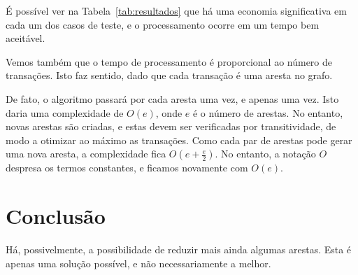 \documentclass[12pt]{article}
\begin{document}
É possível ver na Tabela~\ref{tab:resultados} que há uma economia significativa
em cada um dos casos de teste, e o processamento ocorre em um tempo bem aceitável.

Vemos também que o tempo de processamento é proporcional ao número de
transações. Isto faz sentido, dado que cada transação é uma aresta no grafo.

De fato, o algoritmo passará por cada aresta uma vez, e apenas uma vez. Isto
daria uma complexidade de $O(e)$, onde $e$ é o número de arestas. No entanto,
novas arestas são criadas, e estas devem ser verificadas por transitividade, de
modo a otimizar ao máximo as transações. Como cada par de arestas pode gerar uma
nova aresta, a complexidade fica $O(e + \frac{e}{2})$. No entanto, a notação $O$
despresa os termos constantes, e ficamos novamente com $O(e)$.

\section{Conclusão}\label{sec:conclusao}

Há, possivelmente, a possibilidade de reduzir mais ainda algumas arestas. Esta é
apenas uma solução possível, e não necessariamente a melhor.
\end{document}
